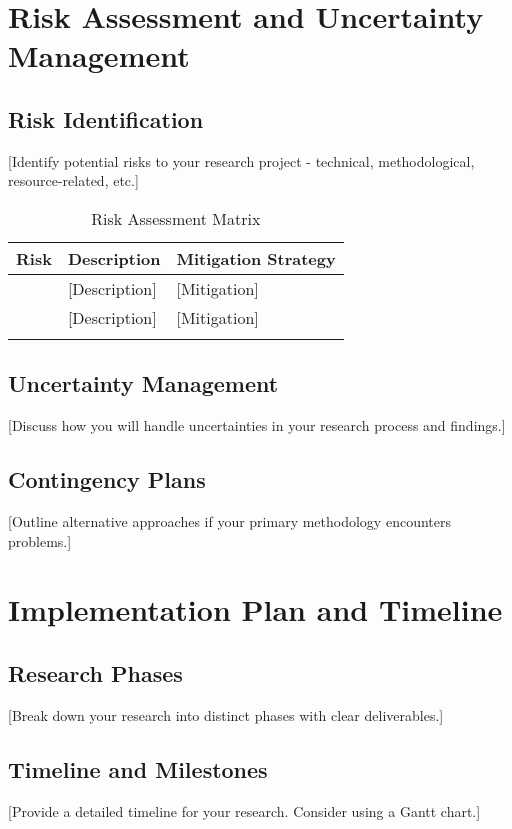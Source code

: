 \documentclass[12pt,a4paper]{article}
\begin{document}
\section{Risk Assessment and Uncertainty Management}
\label{sec:risk}

\subsection{Risk Identification}
[Identify potential risks to your research project - technical, methodological, resource-related, etc.]

\begin{table}[H]
\centering
\caption{Risk Assessment Matrix}
\begin{tabular}{|p{3cm}|p{6cm}|p{6cm}|}
\hline
\textbf{Risk} & \textbf{Description} & \textbf{Mitigation Strategy} \\
\hline
[Risk 1] & [Description] & [Mitigation] \\
\hline
[Risk 2] & [Description] & [Mitigation] \\
\hline
[Add more rows as needed] & & \\
\hline
\end{tabular}
\end{table}

\subsection{Uncertainty Management}
[Discuss how you will handle uncertainties in your research process and findings.]

\subsection{Contingency Plans}
[Outline alternative approaches if your primary methodology encounters problems.]

\section{Implementation Plan and Timeline}
\label{sec:implementation}

\subsection{Research Phases}
[Break down your research into distinct phases with clear deliverables.]

\subsection{Timeline and Milestones}
[Provide a detailed timeline for your research. Consider using a Gantt chart.]
\end{document}
